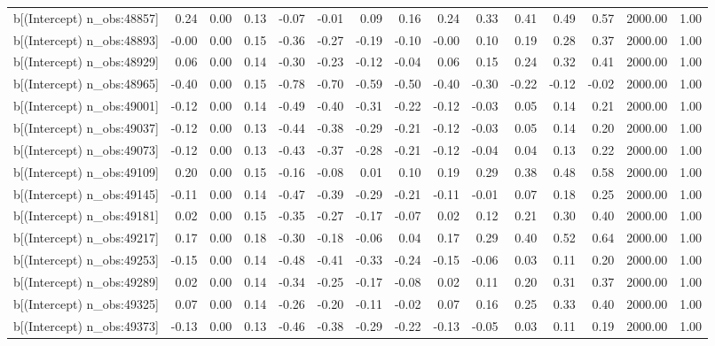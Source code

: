 \begin{table}[ht]
\begin{tabular}{rrrrrrrrrrrrrrr}
  b[(Intercept) n\_obs:48857] & 0.24 & 0.00 & 0.13 & -0.07 & -0.01 & 0.09 & 0.16 & 0.24 & 0.33 & 0.41 & 0.49 & 0.57 & 2000.00 & 1.00 \\ 
  b[(Intercept) n\_obs:48893] & -0.00 & 0.00 & 0.15 & -0.36 & -0.27 & -0.19 & -0.10 & -0.00 & 0.10 & 0.19 & 0.28 & 0.37 & 2000.00 & 1.00 \\ 
  b[(Intercept) n\_obs:48929] & 0.06 & 0.00 & 0.14 & -0.30 & -0.23 & -0.12 & -0.04 & 0.06 & 0.15 & 0.24 & 0.32 & 0.41 & 2000.00 & 1.00 \\ 
  b[(Intercept) n\_obs:48965] & -0.40 & 0.00 & 0.15 & -0.78 & -0.70 & -0.59 & -0.50 & -0.40 & -0.30 & -0.22 & -0.12 & -0.02 & 2000.00 & 1.00 \\ 
  b[(Intercept) n\_obs:49001] & -0.12 & 0.00 & 0.14 & -0.49 & -0.40 & -0.31 & -0.22 & -0.12 & -0.03 & 0.05 & 0.14 & 0.21 & 2000.00 & 1.00 \\ 
  b[(Intercept) n\_obs:49037] & -0.12 & 0.00 & 0.13 & -0.44 & -0.38 & -0.29 & -0.21 & -0.12 & -0.03 & 0.05 & 0.14 & 0.20 & 2000.00 & 1.00 \\ 
  b[(Intercept) n\_obs:49073] & -0.12 & 0.00 & 0.13 & -0.43 & -0.37 & -0.28 & -0.21 & -0.12 & -0.04 & 0.04 & 0.13 & 0.22 & 2000.00 & 1.00 \\ 
  b[(Intercept) n\_obs:49109] & 0.20 & 0.00 & 0.15 & -0.16 & -0.08 & 0.01 & 0.10 & 0.19 & 0.29 & 0.38 & 0.48 & 0.58 & 2000.00 & 1.00 \\ 
  b[(Intercept) n\_obs:49145] & -0.11 & 0.00 & 0.14 & -0.47 & -0.39 & -0.29 & -0.21 & -0.11 & -0.01 & 0.07 & 0.18 & 0.25 & 2000.00 & 1.00 \\ 
  b[(Intercept) n\_obs:49181] & 0.02 & 0.00 & 0.15 & -0.35 & -0.27 & -0.17 & -0.07 & 0.02 & 0.12 & 0.21 & 0.30 & 0.40 & 2000.00 & 1.00 \\ 
  b[(Intercept) n\_obs:49217] & 0.17 & 0.00 & 0.18 & -0.30 & -0.18 & -0.06 & 0.04 & 0.17 & 0.29 & 0.40 & 0.52 & 0.64 & 2000.00 & 1.00 \\ 
  b[(Intercept) n\_obs:49253] & -0.15 & 0.00 & 0.14 & -0.48 & -0.41 & -0.33 & -0.24 & -0.15 & -0.06 & 0.03 & 0.11 & 0.20 & 2000.00 & 1.00 \\ 
  b[(Intercept) n\_obs:49289] & 0.02 & 0.00 & 0.14 & -0.34 & -0.25 & -0.17 & -0.08 & 0.02 & 0.11 & 0.20 & 0.31 & 0.37 & 2000.00 & 1.00 \\ 
  b[(Intercept) n\_obs:49325] & 0.07 & 0.00 & 0.14 & -0.26 & -0.20 & -0.11 & -0.02 & 0.07 & 0.16 & 0.25 & 0.33 & 0.40 & 2000.00 & 1.00 \\ 
  b[(Intercept) n\_obs:49373] & -0.13 & 0.00 & 0.13 & -0.46 & -0.38 & -0.29 & -0.22 & -0.13 & -0.05 & 0.03 & 0.11 & 0.19 & 2000.00 & 1.00 \\ 

\end{tabular}
\end{table}
